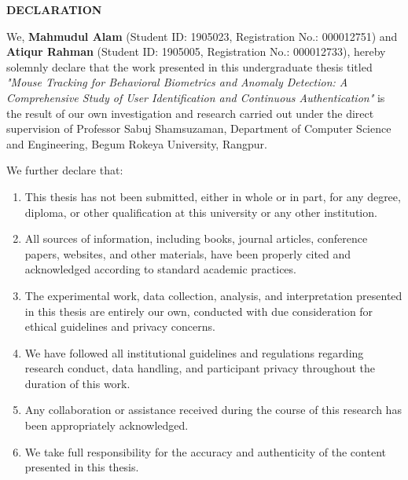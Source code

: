 \documentclass[
  11pt,
  a4paper,
]{article}
\begin{document}
\newpage
\thispagestyle{plain}

\begin{center}
\vspace*{2cm}
\textbf{\Large DECLARATION}
\end{center}

\vspace*{2cm}

We, \textbf{Mahmudul Alam} (Student ID: 1905023, Registration No.:
000012751) and \textbf{Atiqur Rahman} (Student ID: 1905005, Registration
No.: 000012733), hereby solemnly declare that the work presented in this
undergraduate thesis titled
\textit{"Mouse Tracking for Behavioral Biometrics and Anomaly Detection: A Comprehensive Study of User Identification and Continuous Authentication"}
is the result of our own investigation and research carried out under
the direct supervision of Professor Sabuj Shamsuzaman, Department of
Computer Science and Engineering, Begum Rokeya University, Rangpur.

We further declare that:

\begin{enumerate}
\item This thesis has not been submitted, either in whole or in part, for any degree, diploma, or other qualification at this university or any other institution.

\item All sources of information, including books, journal articles, conference papers, websites, and other materials, have been properly cited and acknowledged according to standard academic practices.

\item The experimental work, data collection, analysis, and interpretation presented in this thesis are entirely our own, conducted with due consideration for ethical guidelines and privacy concerns.

\item We have followed all institutional guidelines and regulations regarding research conduct, data handling, and participant privacy throughout the duration of this work.

\item Any collaboration or assistance received during the course of this research has been appropriately acknowledged.

\item We take full responsibility for the accuracy and authenticity of the content presented in this thesis.
\end{enumerate}
\end{document}
